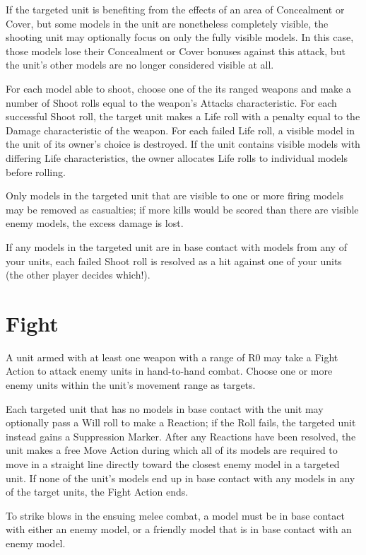 \begin{multicols}{2}
If the targeted unit is benefiting from the effects of an area of Concealment or Cover, but some models in the unit are nonetheless completely visible, the shooting unit may optionally focus on only the fully visible models. In this case, those models lose their Concealment or Cover bonuses against this attack, but the unit's other models are no longer considered visible at all.

For each model able to shoot, choose one of the its ranged weapons and make a number of Shoot rolls equal to the weapon's Attacks characteristic. For each successful Shoot roll, the target unit makes a Life roll with a penalty equal to the Damage characteristic of the weapon. For each failed Life roll, a visible model in the unit of its owner's choice is destroyed. If the unit contains visible models with differing Life characteristics, the owner allocates Life rolls to individual models before rolling.

Only models in the targeted unit that are visible to one or more firing models may be removed as casualties; if more kills would be scored than there are visible enemy models, the excess damage is lost.

If any models in the targeted unit are in base contact with models from any of your units, each failed Shoot roll is resolved as a hit against one of your units (the other player decides which!).




\section*{Fight}
A unit armed with at least one weapon with a range of R0 may take a Fight Action to attack enemy units in hand-to-hand combat. Choose one or more enemy units within the unit's movement range as targets.

Each targeted unit that has no models in base contact with the unit may optionally pass a Will roll to make a Reaction; if the Roll fails, the targeted unit instead gains a Suppression Marker. After any Reactions have been resolved, the unit makes a free Move Action during which all of its models are required to move in a straight line directly toward the closest enemy model in a targeted unit. If none of the unit's models end up in base contact with any models in any of the target units, the Fight Action ends.

To strike blows in the ensuing melee combat, a model must be in base contact with either an enemy model, or a friendly model that is in base contact with an enemy model.


\end{multicols}
